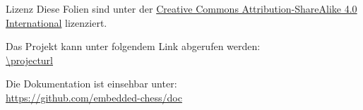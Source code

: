 
\begin{frame}{Lizenz}
    Diese Folien sind unter der \href{https://creativecommons.org/licenses/by-sa/4.0/}{Creative Commons Attribution-ShareAlike 4.0 International} lizenziert. \ccbysa
    
    Das Projekt kann unter folgendem Link abgerufen werden:\\
    \small\url{\projecturl}

    Die Dokumentation ist einsehbar unter:\\
    \small\url{https://github.com/embedded-chess/doc}
\end{frame}
